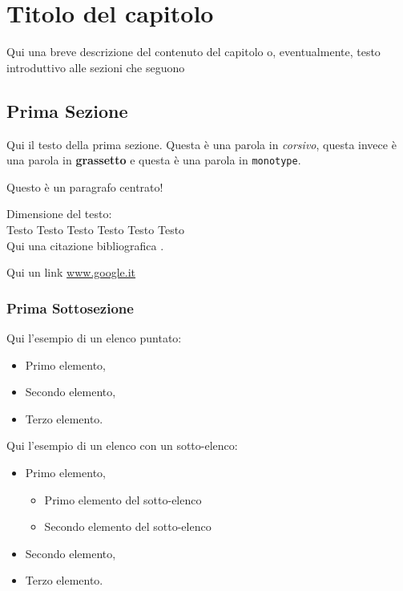 \chapter{Titolo del capitolo}
Qui una breve descrizione del contenuto del capitolo o, eventualmente, testo introduttivo alle sezioni che seguono

\section{Prima Sezione}
Qui il testo della prima sezione. Questa è  una parola in \textit{corsivo}, questa invece è una parola in \textbf{grassetto} e questa è una parola in \texttt{monotype}.

\begin{center}
Questo è un paragrafo centrato!
\end{center}

Dimensione del testo:\\

\LARGE{Testo} \Large{Testo} \large{Testo} \normalsize{Testo} \small{Testo} \footnotesize{Testo}\\

Qui una citazione bibliografica \cite{bib001}.

Qui un link \url{www.google.it}


\subsection{Prima Sottosezione}

Qui l'esempio di un elenco puntato:

\begin{itemize}
\item Primo elemento,
\item Secondo elemento,
\item Terzo elemento.
\end{itemize}

Qui l'esempio di un elenco con un sotto-elenco:

\begin{itemize}
\item Primo elemento,
\begin{itemize}
\item Primo elemento del sotto-elenco
\item Secondo elemento del sotto-elenco
\end{itemize}
\item Secondo elemento,
\item Terzo elemento.
\end{itemize}

